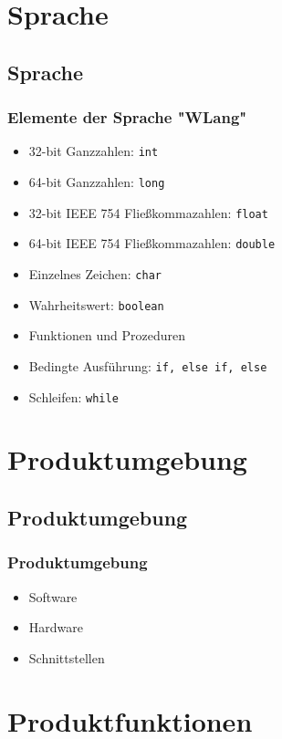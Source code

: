 \documentclass{beamer}
\begin{document}
\section{Sprache}
\subsection{Sprache}
\begin{frame}
\frametitle{Elemente der Sprache "WLang"}
\begin{itemize}
\item  32-bit Ganzzahlen: \texttt{int}
  \item  64-bit Ganzzahlen: \texttt{long}
 \item  32-bit IEEE 754 Fließkommazahlen: \texttt{float}
 \item   64-bit IEEE 754 Fließkommazahlen: \texttt{double}
  \item  Einzelnes Zeichen: \texttt{char}
  \item  Wahrheitswert: \texttt{boolean}
\item Funktionen und Prozeduren %
\item Bedingte Ausführung: \texttt{if, else if, else}
\item Schleifen: \texttt{while}
\end{itemize}
\end{frame}


\section{Produktumgebung}
\subsection{Produktumgebung}
\begin{frame}
\frametitle{Produktumgebung}
\begin{itemize}
\item Software
\item Hardware
\item Schnittstellen
\end{itemize}
\end{frame}


\section{Produktfunktionen}
\end{document}
